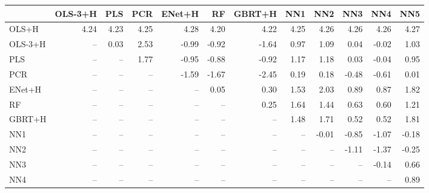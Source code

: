\begin{tabular}{lrrrrrrrrrrr}
\toprule
 & OLS-3+H & PLS & PCR & ENet+H & RF & GBRT+H & NN1 & NN2 & NN3 & NN4 & NN5 \\
\midrule
OLS+H & 4.24 & 4.23 & 4.25 & 4.28 & 4.20 & 4.22 & 4.25 & 4.26 & 4.26 & 4.26 & 4.27 \\
OLS-3+H & -- & 0.03 & 2.53 & -0.99 & -0.92 & -1.64 & 0.97 & 1.09 & 0.04 & -0.02 & 1.03 \\
PLS & -- & -- & 1.77 & -0.95 & -0.88 & -0.92 & 1.17 & 1.18 & 0.03 & -0.04 & 0.95 \\
PCR & -- & -- & -- & -1.59 & -1.67 & -2.45 & 0.19 & 0.18 & -0.48 & -0.61 & 0.01 \\
ENet+H & -- & -- & -- & -- & 0.05 & 0.30 & 1.53 & 2.03 & 0.89 & 0.87 & 1.82 \\
RF & -- & -- & -- & -- & -- & 0.25 & 1.64 & 1.44 & 0.63 & 0.60 & 1.21 \\
GBRT+H & -- & -- & -- & -- & -- & -- & 1.48 & 1.71 & 0.52 & 0.52 & 1.81 \\
NN1 & -- & -- & -- & -- & -- & -- & -- & -0.01 & -0.85 & -1.07 & -0.18 \\
NN2 & -- & -- & -- & -- & -- & -- & -- & -- & -1.11 & -1.37 & -0.25 \\
NN3 & -- & -- & -- & -- & -- & -- & -- & -- & -- & -0.14 & 0.66 \\
NN4 & -- & -- & -- & -- & -- & -- & -- & -- & -- & -- & 0.89 \\
\bottomrule
\end{tabular}
